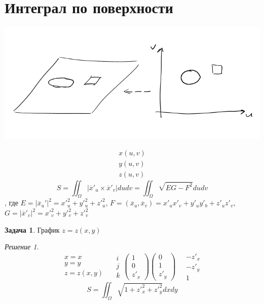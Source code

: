\documentclass[english]{article}
\theoremstyle{plain}
\theoremstyle{remark}
\newtheorem*{solution}{Решение}
\theoremstyle{definition}
\newtheorem{task}{Задача}
\begin{document}
\section{Интеграл по поверхности}
\label{sec:orgedc4ad7}
\begin{center}
\includegraphics[scale=0.5]{6_3.png}
\end{center}
\[ \begin{array}{l} x(u, v) \\ y(u , v) \\ z(u, v) \end{array} \]
\[ S = \iint_\Omega |\overline{x}'_u\times\overline{x}'_v| du dv = \iint_\Omega \sqrt{EG - F^2} du dv \]
, где \(E = |\overline{x}_u'|^2 = x'_u^2 + y'_u^2 + z'_u^2\), \(F = (\overline{x}_u, \overline{x}_v) = x'_ux'_v + y'_uy'_b + z'_uz'_v\), \(G = |\overline{x}'_v|^2 = x'_v^2 + y'_v^2 + z'_v^2\)
\begin{task}
График \(z = z(x, y)\)
\end{task}
\begin{solution}
\[ \begin{array}{l} x = x \\ y = y \\ z = z(x, y) \end{array}\quad \begin{matrix} i \\ j \\ k \end{matrix} \begin{pmatrix} 1 \\ 0 \\ z'_x \end{pmatrix} \begin{pmatrix} 0 \\ 1 \\ z'_y \end{pmatrix} \quad \begin{matrix} -z'_x \\ -z'_y \\ 1 \end{matrix}\]
\[ S = \iint_\Omega \sqrt{1 + z'_x^2 + z'_y^2} dx dy \]
\end{solution}
\end{document}
